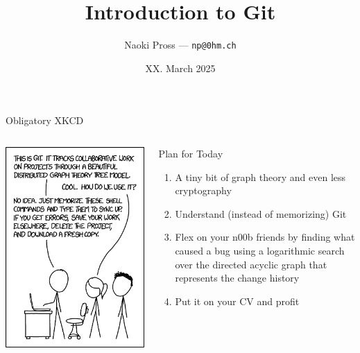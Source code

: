 \documentclass[xetex, handout]{beamer}
\title{Introduction to Git}
\author{
  Naoki Pross --- \texttt{np@0hm.ch}
}
\institute{}
\date{XX. March 2025}
\begin{document}
\frame{\titlepage}

\begin{frame}{Obligatory XKCD}
  \begin{columns}
    \begin{column}{.5\linewidth}
      \includegraphics[width=\linewidth]{pic/xkcd1597}
    \end{column}
    \begin{column}{.5\linewidth}
      \begin{alertblock}{Plan for Today}
        \begin{enumerate}
          \item A tiny bit of graph theory and even less cryptography
          \item Understand (instead of memorizing) Git
          \item Flex on your n00b friends by finding what caused a bug using a
            logarithmic search over the directed acyclic graph that represents
            the change history
          \item Put it on your CV and profit
        \end{enumerate}
      \end{alertblock}
    \end{column}
  \end{columns}
\end{frame}
\end{document}
